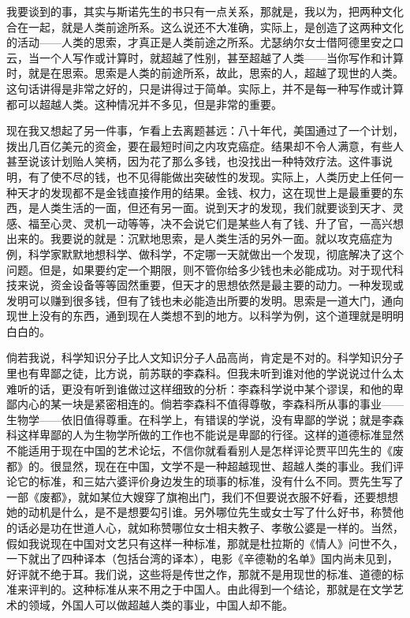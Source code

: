 我要谈到的事，其实与斯诺先生的书只有一点关系，那就是，我以为，把两种文化合在一起，就是人类前途所系。这么说还不大准确，实际上，是创造了这两种文化的活动——人类的思索，才真正是人类前途之所系。尤瑟纳尔女士借阿德里安之口云，当一个人写作或计算时，就超越了性别，甚至超越了人类——当你写作和计算时，就是在思索。思索是人类的前途所系，故此，思索的人，超越了现世的人类。这句话讲得是非常之好的，只是讲得过于简单。实际上，并不是每一种写作或计算都可以超越人类。这种情况并不多见，但是非常的重要。 

现在我又想起了另一件事，乍看上去离题甚远：八十年代，美国通过了一个计划，拨出几百亿美元的资金，要在最短时间之内攻克癌症。结果却不令人满意，有些人甚至说该计划贻人笑柄，因为花了那么多钱，也没找出一种特效疗法。这件事说明，有了使不尽的钱，也不见得能做出突破性的发现。实际上，人类历史上任何一种天才的发现都不是金钱直接作用的结果。金钱、权力，这在现世上是最重要的东西，是人类生活的一面，但还有另一面。说到天才的发现，我们就要谈到天才、灵感、福至心灵、灵机一动等等，决不会说它们是某些人有了钱、升了官，一高兴想出来的。我要说的就是：沉默地思索，是人类生活的另外一面。就以攻克癌症为例，科学家默默地想科学、做科学，不定哪一天就做出一个发现，彻底解决了这个问题。但是，如果要约定一个期限，则不管你给多少钱也未必能成功。对于现代科技来说，资金设备等等固然重要，但天才的思想依然是最主要的动力。一种发现或发明可以赚到很多钱，但有了钱也未必能造出所要的发明。思索是一道大门，通向现世上没有的东西，通到现在人类想不到的地方。以科学为例，这个道理就是明明白白的。 

倘若我说，科学知识分子比人文知识分子人品高尚，肯定是不对的。科学知识分子里也有卑鄙之徒，比方说，前苏联的李森科。但我未听到谁对他的学说说过什么太难听的话，更没有听到谁做过这样细致的分析：李森科学说中某个谬误，和他的卑鄙内心的某一块是紧密相连的。倘若李森科不值得尊敬，李森科所从事的事业——生物学——依旧值得尊重。在科学上，有错误的学说，没有卑鄙的学说；就是李森科这样卑鄙的人为生物学所做的工作也不能说是卑鄙的行径。这样的道德标准显然不能适用于现在中国的艺术论坛，不信你就看看别人是怎样评论贾平凹先生的《废都》的。很显然，现在在中国，文学不是一种超越现世、超越人类的事业。我们评论它的标准，和三姑六婆评价身边发生的琐事的标准，没有什么不同。贾先生写了一部《废都》，就如某位大嫂穿了旗袍出门，我们不但要说衣服不好看，还要想想她的动机是什么，是不是想要勾引谁。另外哪位先生或女士写了什么好书，称赞他的话必是功在世道人心，就如称赞哪位女士相夫教子、孝敬公婆是一样的。当然，假如我说现在中国对文艺只有这样一种标准，那就是杜拉斯的《情人》问世不久，一下就出了四种译本（包括台湾的译本），电影《辛德勒的名单》国内尚未见到，好评就不绝于耳。我们说，这些将是传世之作，那就不是用现世的标准、道德的标准来评判的。这种标准从来不用之于中国人。由此得到一个结论，那就是在文学艺术的领域，外国人可以做超越人类的事业，中国人却不能。 

